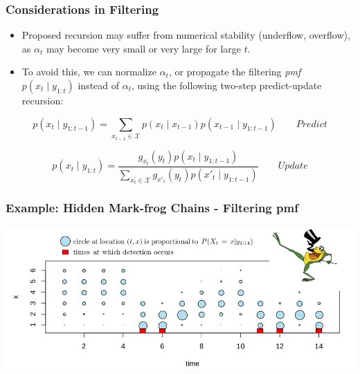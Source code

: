 \documentclass[xcolor=dvipsnames, compress]{beamer}
\begin{document}
%
\begin{frame}
\frametitle{Considerations in Filtering}
\begin{itemize}
\item  Proposed recursion may suffer from numerical stability (underflow, overflow),
as $\alpha_{t}$ may become very small or very large for large $t$. 
\item To avoid this, we can normalize $\alpha_{t}$, or propagate the filtering
\emph{pmf $p\left(x_{t}\mid y_{1:t}\right)$ }instead of $\alpha_{t}$,
using the following two-step predict-update recursion:
\end{itemize}
$$
p\left(x_{t}\mid y_{1:t-1}\right)=\sum_{x_{t-1}\in\mathcal{{X}}}p\left(x_{t}\mid x_{t-1}\right)p\left(x_{t-1}\mid y_{1:t-1}\right)\qquad Predict
$$

$$
p\left(x_{t}\mid y_{1:t}\right)=\frac{g_{x_{t}}\left(y_{t}\right)p\left(x_{t}\mid y_{1:t-1}\right)}{\sum_{x_{t}^{'}\in\mathcal{{X}}}g_{x'_{t}}\left(y_{t}\right)p\left(x'_{t}\mid y_{1:t-1}\right)}\qquad Update
$$
\end{frame}

\begin{frame}
\frametitle{Example: Hidden Mark-frog Chains - Filtering pmf}
\begin{center}
	\includegraphics[width=1.01\textwidth]{images/frog_filtering.png}
\end{center}
\end{frame}
\end{document}
